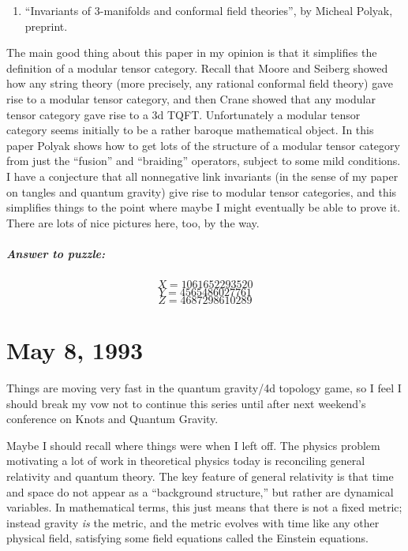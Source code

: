 \documentclass{article}
\def\tightlist{}
\begin{document}
\begin{enumerate}
\def\labelenumi{\arabic{enumi})}
\setcounter{enumi}{5}
\tightlist
\item
  ``Invariants of 3-manifolds and conformal field theories'', by Micheal
  Polyak, preprint.
\end{enumerate}

The main good thing about this paper in my opinion is that it simplifies
the definition of a modular tensor category. Recall that Moore and
Seiberg showed how any string theory (more precisely, any rational
conformal field theory) gave rise to a modular tensor category, and then
Crane showed that any modular tensor category gave rise to a 3d TQFT.
Unfortunately a modular tensor category seems initially to be a rather
baroque mathematical object. In this paper Polyak shows how to get lots
of the structure of a modular tensor category from just the ``fusion''
and ``braiding'' operators, subject to some mild conditions. I have a
conjecture that all nonnegative link invariants (in the sense of my
paper on tangles and quantum gravity) give rise to modular tensor
categories, and this simplifies things to the point where maybe I might
eventually be able to prove it. There are lots of nice pictures here,
too, by the way.

\hypertarget{answer-to-puzzle}{%
\subparagraph{Answer to puzzle:}\label{answer-to-puzzle}}

\[X = 1061652293520\] \[Y = 4565486027761\] \[Z = 4687298610289\]
\hypertarget{week14}{%
\section{May 8, 1993}\label{week14}}

Things are moving very fast in the quantum gravity/4d topology game, so
I feel I should break my vow not to continue this series until after
next weekend's conference on Knots and Quantum Gravity.

Maybe I should recall where things were when I left off. The physics
problem motivating a lot of work in theoretical physics today is
reconciling general relativity and quantum theory. The key feature of
general relativity is that time and space do not appear as a
``background structure,'' but rather are dynamical variables. In
mathematical terms, this just means that there is not a fixed metric;
instead gravity \emph{is} the metric, and the metric evolves with time
like any other physical field, satisfying some field equations called
the Einstein equations.
\end{document}
